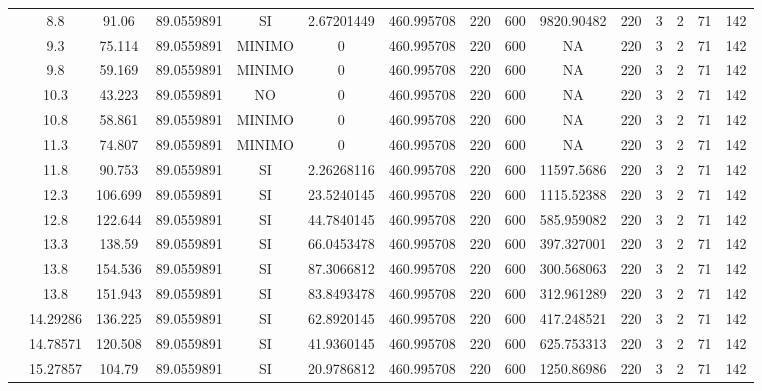 \begin{table}[H]
{\begin{tabular}{|c|c|c|c|c|c|c|c|c|c|c|c|c|c|c|}
\cline{2-15}    & 8.8 & 91.06 & 89.0559891 & SI  & 2.67201449 & 460.995708 & 220 & 600 & 9820.90482 & 220 & 3   & 2   & 71  & 142 \bigstrut\\
\cline{2-15}    & 9.3 & 75.114 & 89.0559891 & MINIMO & 0   & 460.995708 & 220 & 600 & NA  & 220 & 3   & 2   & 71  & 142 \bigstrut\\
\cline{2-15}    & 9.8 & 59.169 & 89.0559891 & MINIMO & 0   & 460.995708 & 220 & 600 & NA  & 220 & 3   & 2   & 71  & 142 \bigstrut\\
\cline{2-15}    & 10.3 & 43.223 & 89.0559891 & NO  & 0   & 460.995708 & 220 & 600 & NA  & 220 & 3   & 2   & 71  & 142 \bigstrut\\
\cline{2-15}    & 10.8 & 58.861 & 89.0559891 & MINIMO & 0   & 460.995708 & 220 & 600 & NA  & 220 & 3   & 2   & 71  & 142 \bigstrut\\
\cline{2-15}    & 11.3 & 74.807 & 89.0559891 & MINIMO & 0   & 460.995708 & 220 & 600 & NA  & 220 & 3   & 2   & 71  & 142 \bigstrut\\
\cline{2-15}    & 11.8 & 90.753 & 89.0559891 & SI  & 2.26268116 & 460.995708 & 220 & 600 & 11597.5686 & 220 & 3   & 2   & 71  & 142 \bigstrut\\
\cline{2-15}    & 12.3 & 106.699 & 89.0559891 & SI  & 23.5240145 & 460.995708 & 220 & 600 & 1115.52388 & 220 & 3   & 2   & 71  & 142 \bigstrut\\
\cline{2-15}    & 12.8 & 122.644 & 89.0559891 & SI  & 44.7840145 & 460.995708 & 220 & 600 & 585.959082 & 220 & 3   & 2   & 71  & 142 \bigstrut\\
\cline{2-15}    & 13.3 & 138.59 & 89.0559891 & SI  & 66.0453478 & 460.995708 & 220 & 600 & 397.327001 & 220 & 3   & 2   & 71  & 142 \bigstrut\\
\cline{2-15}    & 13.8 & 154.536 & 89.0559891 & SI  & 87.3066812 & 460.995708 & 220 & 600 & 300.568063 & 220 & 3   & 2   & 71  & 142 \bigstrut\\
\cline{2-15}    & 13.8 & 151.943 & 89.0559891 & SI  & 83.8493478 & 460.995708 & 220 & 600 & 312.961289 & 220 & 3   & 2   & 71  & 142 \bigstrut\\
\cline{2-15}    & 14.29286 & 136.225 & 89.0559891 & SI  & 62.8920145 & 460.995708 & 220 & 600 & 417.248521 & 220 & 3   & 2   & 71  & 142 \bigstrut\\
\cline{2-15}    & 14.78571 & 120.508 & 89.0559891 & SI  & 41.9360145 & 460.995708 & 220 & 600 & 625.753313 & 220 & 3   & 2   & 71  & 142 \bigstrut\\
\cline{2-15}    & 15.27857 & 104.79 & 89.0559891 & SI  & 20.9786812 & 460.995708 & 220 & 600 & 1250.86986 & 220 & 3   & 2   & 71  & 142 \bigstrut\\

\end{tabular}}
\end{table}

